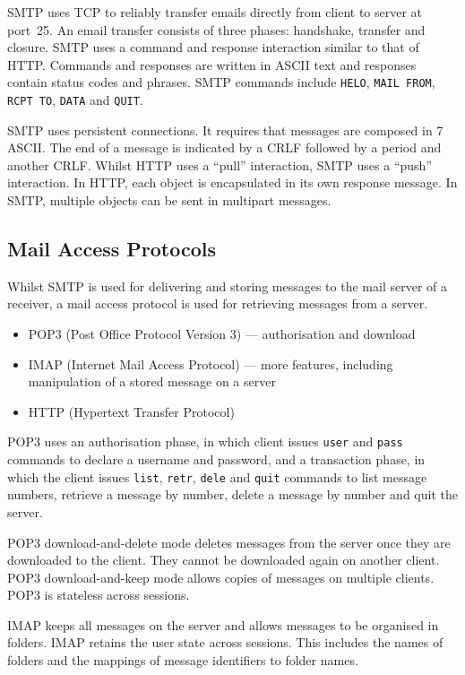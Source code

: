 SMTP uses TCP to reliably transfer emails directly from client to server at port~\num{25}.
An email transfer consists of three phases: handshake, transfer and closure.
SMTP uses a command and response interaction similar to that of HTTP\@.
Commands and responses are written in ASCII text and responses contain status codes and phrases.
SMTP commands include \texttt{HELO}, \texttt{MAIL FROM}, \texttt{RCPT TO}, \texttt{DATA} and \texttt{QUIT}.

SMTP uses persistent connections.
It requires that messages are composed in \SI{7}{\bit} ASCII\@.
The end of a message is indicated by a CRLF followed by a period and another CRLF\@.
Whilst HTTP uses a ``pull'' interaction, SMTP uses a ``push'' interaction.
In HTTP, each object is encapsulated in its own response message.
In SMTP, multiple objects can be sent in multipart messages.

\subsection{Mail Access Protocols}

Whilst SMTP is used for delivering and storing messages to the mail server of a receiver, a mail access protocol is used for retrieving messages from a server.
\begin{itemize}
  \item POP3 (Post Office Protocol Version 3) --- authorisation and download
  \item IMAP (Internet Mail Access Protocol) --- more features, including manipulation of a stored message on a server
  \item HTTP (Hypertext Transfer Protocol)
\end{itemize}

POP3 uses an authorisation phase, in which client issues \texttt{user} and \texttt{pass} commands to declare a username and password, and a transaction phase, in which the client issues \texttt{list}, \texttt{retr}, \texttt{dele} and \texttt{quit} commands to list message numbers, retrieve a message by number, delete a message by number and quit the server.

POP3 download-and-delete mode deletes messages from the server once they are downloaded to the client.
They cannot be downloaded again on another client.
POP3 download-and-keep mode allows copies of messages on multiple clients.
POP3 is stateless across sessions.

IMAP keeps all messages on the server and allows messages to be organised in folders.
IMAP retains the user state across sessions.
This includes the names of folders and the mappings of message identifiers to folder names.

